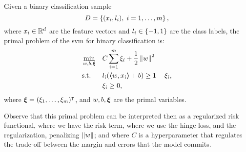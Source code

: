 \begin{definition}
    Given a binary classification sample
    $$ D = \left\{(x_i, l_i), \; i=1, \ldots, m\right\} ,$$
    where $x_i \in \mathbb{R}^d$ are the feature vectors and $l_i \in \left\{-1, 1\right\}$ are the class labels, 
    the primal problem of the \acrshort{svm} for binary classification is:
    \begin{equation}
        \label{eq:linear_primal_clas}
        \begin{aligned}
            &\min_{w, b, \fv{\xi}} & & C \sum_{i=1}^m \xi_i + \frac{1}{2} \norm{w}^2 \\
            & \text{s.t.} & & l_i (\dotp{w}{x_i} + b) \geq 1 - \xi_i , \\
            & & & \xi_i \geq 0 ,      
        \end{aligned}  
    \end{equation}
    where $\bm{\xi} = (\xi_1, \ldots, \xi_m)^\intercal$, and $w, b, \bm{\xi}$ are the primal variables.
\end{definition}
Observe that this primal problem can be interpreted then as a regularized risk functional, where we have the risk term, where we use the hinge loss, and the regularization, penalizing $\left\lVert w\right\rVert$; and where $C$ is a hyperparameter that regulates the trade-off between the margin and errors that the model commits.

